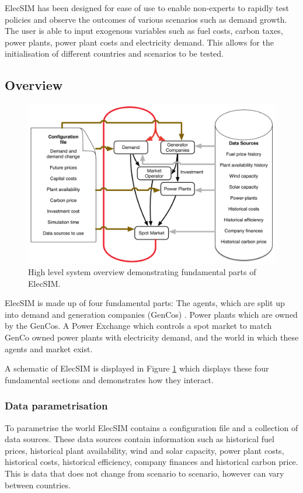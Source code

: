 
ElecSIM has been designed for ease of use to enable non-experts to rapidly test policies and observe the outcomes of various scenarios such as demand growth. The user is able to input exogenous variables such as fuel costs, carbon taxes, power plants, power plant costs and electricity demand. This allows for the initialisation of different countries and scenarios to be tested.


\subsection{Overview}

\begin{figure}[b]
	\centering
	\includegraphics[width=0.97\linewidth]{figures/System_overview}
	\caption{High level system overview demonstrating fundamental parts of ElecSIM.}
	\label{fig:systemoverview}
\end{figure}




ElecSIM is made up of four fundamental parts: The agents, which are split up into demand and generation companies (GenCos) . Power plants which are owned by the GenCos. A Power Exchange which controls a spot market to match GenCo owned power plants with electricity demand, and the world in which these agents and market exist.

A schematic of ElecSIM is displayed in Figure \ref{fig:systemoverview} which displays these four fundamental sections and demonstrates how they interact.

\subsubsection{Data parametrisation} To parametrise the world ElecSIM contains a configuration file and a collection of data sources. These data sources contain information such as historical fuel prices, historical plant availability, wind and solar capacity, power plant costs, historical costs, historical efficiency, company finances and historical carbon price. This is data that does not change from scenario to scenario, however can vary between countries.

